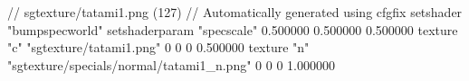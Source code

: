 // sgtexture/tatami1.png (127)
// Automatically generated using cfgfix
setshader "bumpspecworld"
setshaderparam "specscale" 0.500000 0.500000 0.500000
texture "c" "sgtexture/tatami1.png" 0 0 0 0.500000
texture "n" "sgtexture/specials/normal/tatami1_n.png" 0 0 0 1.000000
